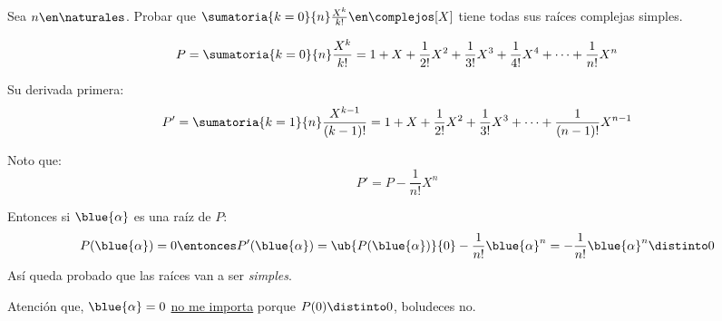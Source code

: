 \begin{enunciado}{\ejercicio}
  Sea $n \en \naturales$.
  Probar que $\sumatoria{k=0}{n}\frac{X^k}{k!} \en \complejos[X]$ tiene todas sus raíces complejas simples.
\end{enunciado}

$$
  P = \sumatoria{k=0}{n}\frac{X^k}{k!} =
  1 + X + \frac{1}{2!}X^2 + \frac{1}{3!}X^3 + \frac{1}{4!}X^4 + \cdots + \frac{1}{n!}X^n
$$

Su derivada primera:
$$
  P' = \sumatoria{k=1}{n}\frac{X^{k-1}}{(k-1)!} =
  1 + X + \frac{1}{2!}X^2 + \frac{1}{3!}X^3 + \cdots + \frac{1}{(n-1)!}X^{n-1}
$$

Noto que:
$$
  P' = P - \frac{1}{n!}X^n
$$

Entonces si $\blue{\alpha}$ es una raíz de $P$:
$$
  P(\blue{\alpha}) = 0
  \entonces
  P'(\blue{\alpha}) =
  \ub{P(\blue{\alpha})}{0} - \frac{1}{n!}\blue{\alpha}^n = - \frac{1}{n!}\blue{\alpha}^n \distinto 0
$$
Así queda probado que las raíces van a ser \textit{simples}.

Atención que, $\blue{\alpha} = 0$ \underline{no me importa} porque $P(0) \distinto 0$, boludeces no.

\begin{aportes}
  \item {}
\end{aportes}
